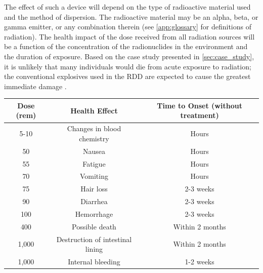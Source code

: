 \documentclass{report}
\begin{document}
The effect of such a device will depend on the type of radioactive material used and the method of dispersion. The radioactive material may be an alpha, beta, or gamma emitter, or any combination therein (see \autoref{app:glossary} for definitions of radiation). The health impact of the dose received from all radiation sources will be a function of the concentration of the radionuclides in the environment and the duration of exposure. Based on the case study presented in \autoref{sec:case_study}, it is unlikely that many individuals would die from acute exposure to radiation; the conventional explosives used in the RDD are expected to cause the greatest immediate damage \cite{USDepartmentofHealthandHumanServices:RadiationEmergencyMedicalManagement2014}.

 


\begin{table}
\centering
\begin{tabular}{|c|c|c|}
\hline
\textbf{Dose (rem)} & \textbf{Health Effect}           & \textbf{Time to Onset (without treatment)} \\ \hline
5-10                    & Changes in blood chemistry       & Hours                                      \\ \hline
50                      & Nausea                           & Hours                                      \\ \hline
55                      & Fatigue                          & Hours                                      \\ \hline
70                      & Vomiting                         & Hours                                      \\ \hline
75                      & Hair loss                        & 2-3 weeks                                  \\ \hline
90                      & Diarrhea                         & 2-3 weeks                                  \\ \hline
100                     & Hemorrhage                       & 2-3 weeks                                  \\ \hline
400                     & Possible death                   & Within 2 months                            \\ \hline
1,000                   & Destruction of intestinal lining & Within 2 months                            \\ \hline
1,000                   & Internal bleeding                & 1-2 weeks                                  \\ \hline

\end{tabular}
\end{table}
\end{document}
